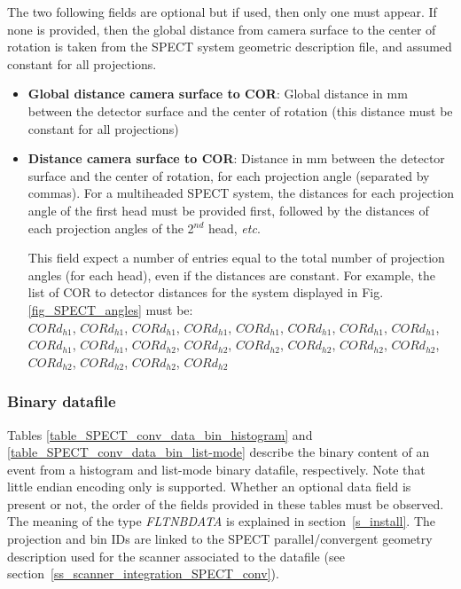 \documentclass[a4paper, 11pt]{article}
\begin{document}
The two following fields are optional but if used, then only one must appear. If none is provided, then the global distance from camera surface
to the center of rotation is taken from the SPECT system geometric description file, and assumed constant for all projections.
\begin{itemize}
  \item \textbf{Global distance camera surface to COR}: Global distance in mm between the detector surface and the center of rotation (this distance must be constant for all projections)
  \item \textbf{Distance camera surface to COR}: Distance in mm between the detector surface and the center of rotation, for each projection angle (separated by commas). For a multiheaded SPECT system, the distances for each projection angle of the first head must be provided first, followed by the distances of each projection angles of the 2$^{nd}$ head, \textit{etc}.

This field expect a number of entries equal to the total number of projection angles (for each head), even if the distances are constant. For example, the list of COR to detector distances for the system displayed in Fig. \ref{fig_SPECT_angles} must be:\\
$CORd_{h1}$, $CORd_{h1}$, $CORd_{h1}$, $CORd_{h1}$, $CORd_{h1}$, $CORd_{h1}$, $CORd_{h1}$, $CORd_{h1}$, $CORd_{h1}$, $CORd_{h1}$, $CORd_{h2}$, $CORd_{h2}$, $CORd_{h2}$, $CORd_{h2}$, $CORd_{h2}$, $CORd_{h2}$, $CORd_{h2}$, $CORd_{h2}$, $CORd_{h2}$, $CORd_{h2}$

\end{itemize}

\subsubsection{Binary datafile}

Tables \ref{table_SPECT_conv_data_bin_histogram} and \ref{table_SPECT_conv_data_bin_list-mode} describe the binary content of an event from a histogram and
list-mode binary datafile, respectively. Note that little endian encoding only is supported. Whether an optional data field is present or not, the order of
the fields provided in these tables must be observed. The meaning of the type \textit{FLTNBDATA} is explained in section~\ref{s_install}. The projection and
bin IDs are linked to the SPECT parallel/convergent geometry description used for the scanner associated to the datafile (see
section~\ref{ss_scanner_integration_SPECT_conv}).
\end{document}
